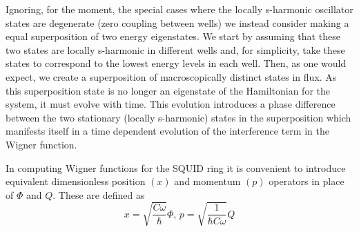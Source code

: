 \documentclass[12pt,a4paper,superscriptaddress,showpacs,floatfix,pra]{revtex4-2}
\begin{document}
Ignoring,  for  the  moment,  the  special  cases  where  the  locally
s-harmonic  oscillator states  are degenerate  (zero  coupling between
wells) we instead consider making  a equal superposition of two energy
eigenstates. We  start by assuming  that these two states  are locally
s-harmonic in  different wells and, for simplicity,  take these states
to correspond to  the lowest energy levels in each  well. Then, as one
would expect,  we create  a superposition of  macroscopically distinct
states in flux. As this superposition state is no longer an eigenstate
of  the Hamiltonian for  the system,  it must  evolve with  time. This
evolution  introduces a  phase difference  between the  two stationary
(locally  s-harmonic)  states  in  the superposition  which  manifests
itself in a  time dependent evolution of the  interference term in the
Wigner function.

In computing Wigner  functions for the SQUID ring  it is convenient to
introduce  equivalent dimensionless  position $\left(  x\right)  $ and
momentum  $\left(  p\right)  $  operators  in place  of  $\Phi  $  and
$Q$. These are defined as
\begin{equation}
x=\sqrt{\frac{C\omega }{\hbar }}\Phi ,\,p=\sqrt{\frac{1}{\hbar C\omega }}Q
\label{posmom}
\end{equation}
\end{document}
